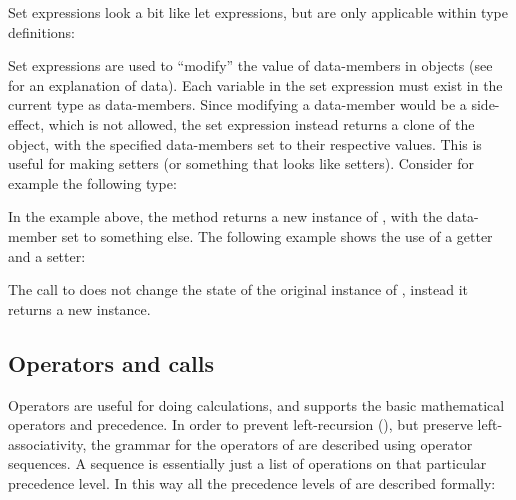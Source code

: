 Set expressions look a bit like let expressions, but are only applicable within type definitions:

\begin{ebnf}
\end{ebnf}

Set expressions are used to ``modify'' the value of data-members in objects (see 
for an explanation of data). Each variable in the set expression must exist in the current type as
data-members. Since modifying a data-member would be a side-effect, which is not allowed, the set expression
instead returns a clone of the object, with the specified data-members set to their respective values. This
is useful for making setters (or something that looks like setters). Consider for example the following
type:


In the example above, the method  returns a new instance of , with
the data-member  set to something else. The following example shows the use of
a getter and a setter:


The call to  does not change the state of the original instance of ,
instead it returns a new instance.

\subsection{Operators and calls}
\label{sec:operatorsandcalls}

Operators are useful for doing calculations, and \productname{} supports the basic
mathematical operators and precedence. In order to prevent left-recursion (),
but preserve left-associativity, the grammar for the operators of \productname{} are
described using operator sequences. A sequence is essentially just a list of
operations on that particular precedence level. In this way all the precedence levels
of \productname{} are described formally:

\begin{ebnf}
\end{ebnf}

